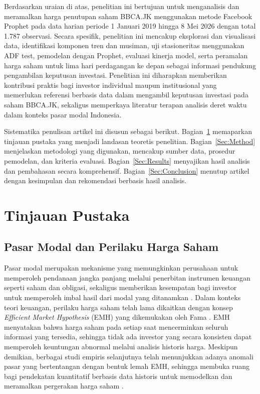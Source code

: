 \documentclass[11pt,twoside]{article}
\begin{document}
Berdasarkan uraian di atas, penelitian ini bertujuan untuk menganalisis dan meramalkan harga
penutupan saham BBCA.JK menggunakan metode Facebook Prophet pada data harian periode
1 Januari 2019 hingga 8 Mei 2026 dengan total 1.787 observasi. Secara spesifik, penelitian ini
mencakup eksplorasi dan visualisasi data, identifikasi komponen tren dan musiman, uji stasioneritas
menggunakan ADF test, pemodelan dengan Prophet, evaluasi kinerja model, serta peramalan
harga saham untuk lima hari perdagangan ke depan sebagai informasi pendukung pengambilan
keputusan investasi. Penelitian ini diharapkan memberikan kontribusi praktis bagi investor
individual maupun institusional yang memerlukan referensi berbasis data dalam mengambil
keputusan investasi pada saham BBCA.JK, sekaligus memperkaya literatur terapan analisis deret
waktu dalam konteks pasar modal Indonesia.

Sistematika penulisan artikel ini disusun sebagai berikut. Bagian~\ref{Sec:Tinjauan} memaparkan tinjauan
pustaka yang menjadi landasan teoretis penelitian. Bagian~\ref{Sec:Method} menjelaskan metodologi
yang digunakan, mencakup sumber data, prosedur pemodelan, dan kriteria evaluasi. Bagian~\ref{Sec:Results}
menyajikan hasil analisis dan pembahasan secara komprehensif. Bagian~\ref{Sec:Conclusion} menutup
artikel dengan kesimpulan dan rekomendasi berbasis hasil analisis.


\section{Tinjauan Pustaka}
\label{Sec:Tinjauan}

\subsection{Pasar Modal dan Perilaku Harga Saham}

Pasar modal merupakan mekanisme yang memungkinkan perusahaan untuk memperoleh
pendanaan jangka panjang melalui penerbitan instrumen keuangan seperti saham dan obligasi,
sekaligus memberikan kesempatan bagi investor untuk memperoleh imbal hasil dari modal yang
ditanamkan \cite{Tandelilin2010}. Dalam konteks teori keuangan, perilaku harga saham telah
lama dikaitkan dengan konsep \textit{Efficient Market Hypothesis} (EMH) yang dikemukakan
oleh Fama \cite{Fama1970}. EMH menyatakan bahwa harga saham pada setiap saat
mencerminkan seluruh informasi yang tersedia, sehingga tidak ada investor yang secara
konsisten dapat memperoleh keuntungan abnormal melalui analisis historis harga. Meskipun
demikian, berbagai studi empiris selanjutnya telah menunjukkan adanya anomali pasar yang
bertentangan dengan bentuk lemah EMH, sehingga membuka ruang bagi pendekatan
kuantitatif berbasis data historis untuk memodelkan dan meramalkan pergerakan harga saham
\cite{Box2015}.
\end{document}
